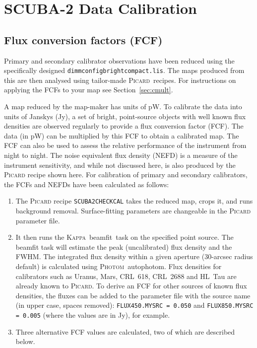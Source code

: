 \documentclass[twoside,11pt]{article}
\newcommand{\htmlref}[2]{#1}
\newcommand{\latexhtml}[2]{#1}
\newcommand{\xref}[3]{#1}
\newcommand{\xlabel}[1]{}
\renewcommand{\_}{\texttt{\symbol{95}}}
\newcommand{\Kappa}{\xref{\textsc{Kappa}}{sun95}{}}
\newcommand{\photom}{\xref{\textsc{Photom}}{sun45}{}}
\newcommand{\picard}{\xref{\textsc{Picard}}{sun265}{}}
\newcommand{\drrecipe}[1]{\texttt{#1}}
\newcommand{\task}[1]{\textsf{#1}}
\newcommand{\beamfit}{\xref{\task{beamfit}}{sun95}{BEAMFIT}}
\newcommand{\autophotom}{\xref{\task{autophotom}}{sun45}{AUTOPHOTOM}}
\newcommand{\cref}[3]{\latexhtml{#1~\ref{#2}}{\htmlref{#3}{#2}}}
\begin{document}
\section{\xlabel{calib}SCUBA-2 Data Calibration}
\label{app:cal}

\subsection{\xlabel{fcf}Flux conversion factors (FCF)}
\label{app:fcf}

Primary and secondary calibrator observations have been reduced using
the specifically designed \texttt{dimmconfig\_bright\_compact.lis}.
The maps produced from this are then analysed using tailor-made
\picard\ recipes. For instructions on applying the FCFs to your map see
\cref{Section}{sec:cmult}{this page}.

A map reduced by the map-maker has units of pW. To calibrate the data
into units of Janskys (Jy), a set of bright, point-source objects with
well known flux densities are observed regularly to provide a flux
conversion factor (FCF). The data (in pW) can be multiplied by this FCF
to obtain a calibrated map. The FCF can also be used to assess the
relative performance of the instrument from night to night. The noise
equivalent flux density (NEFD) is a measure of the instrument
sensitivity, and while not discussed here, is also produced by the
\textsc{Picard} recipe shown here. For calibration of primary and secondary
calibrators, the FCFs and NEFDs have been calculated as follows:

\begin{enumerate}
\item{The \textsc{Picard} recipe \drrecipe{SCUBA2\_CHECK\_CAL} takes the reduced
map, crops it, and runs background removal. Surface-fitting
parameters are changeable in the \textsc{Picard} parameter file.}
\item{It then runs the \Kappa\ \beamfit\ task on the specified point
source. The \task{beamfit} task will estimate the peak (uncalibrated)
flux density and the FWHM. The integrated flux density within a
given aperture (30-arcsec radius default) is calculated using
\photom\ \autophotom. Flux densities for calibrators such as Uranus,
Mars, CRL~618, CRL~2688 and HL~Tau are already known to
\picard. To derive an FCF for other sources of known flux densities,
the fluxes can be added to the parameter file with the source name
(in upper case, spaces removed): \texttt{FLUX\_450.MYSRC = 0.050}
and \texttt{FLUX\_850.MYSRC = 0.005} (where the values are in Jy),
for example.}

\item {Three alternative FCF values are calculated, two of which are
described below.}
\end{enumerate}
\end{document}
